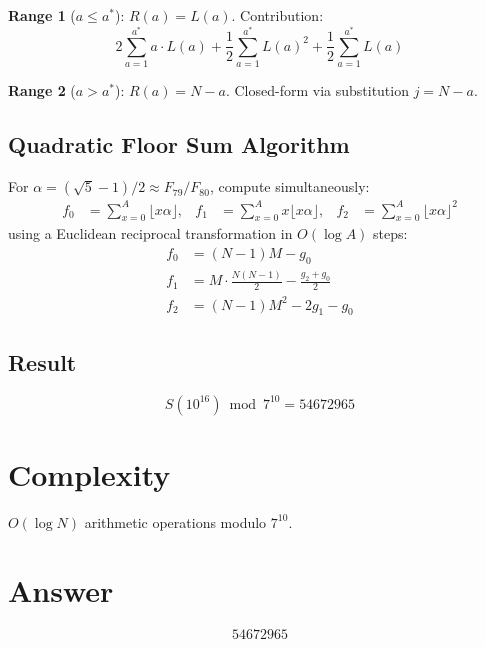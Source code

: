 \documentclass[12pt]{article}
\theoremstyle{definition}
\begin{document}
\textbf{Range 1} ($a \le a^*$): $R(a) = L(a)$. Contribution:
\[
2\sum_{a=1}^{a^*} a \cdot L(a) + \frac{1}{2}\sum_{a=1}^{a^*} L(a)^2 + \frac{1}{2}\sum_{a=1}^{a^*} L(a)
\]

\textbf{Range 2} ($a > a^*$): $R(a) = N - a$. Closed-form via substitution $j = N - a$.

\subsection{Quadratic Floor Sum Algorithm}

For $\alpha = (\sqrt{5}-1)/2 \approx F_{79}/F_{80}$, compute simultaneously:
\begin{align}
f_0 &= \sum_{x=0}^{A} \lfloor x\alpha \rfloor, &
f_1 &= \sum_{x=0}^{A} x \lfloor x\alpha \rfloor, &
f_2 &= \sum_{x=0}^{A} \lfloor x\alpha \rfloor^2
\end{align}
using a Euclidean reciprocal transformation in $O(\log A)$ steps:
\begin{align}
f_0 &= (N-1)M - g_0 \\
f_1 &= M \cdot \tfrac{N(N-1)}{2} - \tfrac{g_2 + g_0}{2} \\
f_2 &= (N-1)M^2 - 2g_1 - g_0
\end{align}

\subsection{Result}
\[
S(10^{16}) \bmod 7^{10} = \boxed{54672965}
\]

\section{Complexity}
$O(\log N)$ arithmetic operations modulo $7^{10}$.

\section{Answer}

\[
\boxed{54672965}
\]
\end{document}
